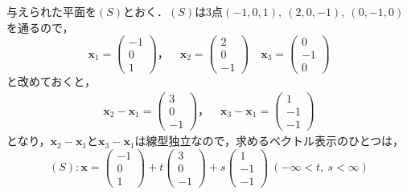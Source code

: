 \documentclass[uplatex,dvipdfmx,a4paper,10pt,fleqn]{jsarticle}
\begin{document}
\begin{tleftbar}
    与えられた平面を$(S)$とおく．$(S)$は3点$(-1,0,1),~(2,0,-1),~(0,-1,0)$を通るので，
    \begin{equation*}
   \bm{x}_1=
        \begin{pmatrix}
            -1 \\
            0 \\
            1
        \end{pmatrix}
   ，\quad \bm{x}_2=
    \begin{pmatrix}
        2 \\
        0 \\
        -1
    \end{pmatrix}
 \quad 
\bm{x}_3=
    \begin{pmatrix}
        0 \\
        -1 \\
        0
    \end{pmatrix}
\end{equation*}
と改めておくと，
\begin{gather*}
    \bm{x}_2 - \bm{x}_1 =
        \begin{pmatrix}
            3 \\
            0 \\
            -1
        \end{pmatrix}
    ，\quad 
    \bm{x}_3 - \bm{x}_1 =
    \begin{pmatrix}
        1 \\
        -1 \\
        -1
    \end{pmatrix}
\end{gather*}
となり，$\bm{x}_2 - \bm{x}_1$と$\bm{x}_3 - \bm{x}_1$は線型独立なので，求めるベクトル表示のひとつは，
\[
    (S) \colon \bm{x}=
        \begin{pmatrix}
            -1 \\
            0 \\
            1
        \end{pmatrix}
    + t 
        \begin{pmatrix}
            3 \\
            0 \\
            -1
        \end{pmatrix}
    +s
        \begin{pmatrix}
            1 \\
            -1 \\
            -1
        \end{pmatrix}
        ~( -\infty < t,~s<\infty)
        \]
    \end{tleftbar}
%
%
%
%
\end{document}
